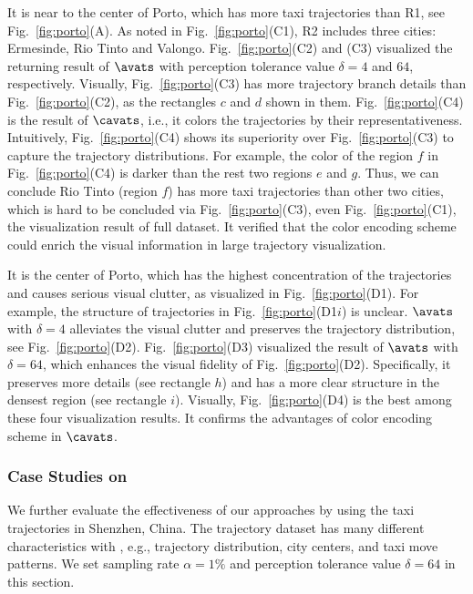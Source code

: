  It is near to the center of Porto, which has more taxi trajectories than R1, see Fig.~\ref{fig:porto}(A).
As noted in Fig.~\ref{fig:porto}(C1), R2 includes three cities: Ermesinde, Rio Tinto and Valongo.
Fig.~\ref{fig:porto}(C2) and (C3) visualized the returning result of $\avats$ with perception tolerance value $\delta=4$ and $64$, respectively.
Visually, Fig.~\ref{fig:porto}(C3) has more trajectory branch details than Fig.~\ref{fig:porto}(C2), as the rectangles $c$ and $d$ shown in them.
Fig.~\ref{fig:porto}(C4) is the result of $\cavats$, i.e., it colors the trajectories by their representativeness.
Intuitively, Fig.~\ref{fig:porto}(C4) shows its superiority over Fig.~\ref{fig:porto}(C3) to capture the trajectory distributions.
For example, the color of the region $f$ in Fig.~\ref{fig:porto}(C4) is {darker} than the rest two regions $e$ and $g$.
Thus, we can conclude Rio Tinto (region $f$) has more taxi trajectories than other two cities, which is hard to be concluded via Fig.~\ref{fig:porto}(C3), even Fig.~\ref{fig:porto}(C1), the visualization result of full dataset.
It verified that the color encoding scheme could enrich the visual information in large trajectory visualization.

 It is the center of Porto, which has the highest concentration of the trajectories and causes serious visual clutter, as visualized in Fig.~\ref{fig:porto}(D1).
For example, the structure of trajectories in Fig.~\ref{fig:porto}(D1$i$) is unclear.
$\avats$ with $\delta=4$ alleviates the visual clutter and preserves the trajectory distribution, see Fig.~\ref{fig:porto}(D2).
Fig.~\ref{fig:porto}(D3) visualized the result of $\avats$ with $\delta=64$, which enhances the visual fidelity of Fig.~\ref{fig:porto}(D2).
Specifically, it preserves more details (see rectangle $h$) and has a more clear structure in the {densest} region (see rectangle $i$).
Visually, Fig.~\ref{fig:porto}(D4) is the best among these four visualization results.
It confirms the advantages of color encoding scheme in $\cavats$.


\subsubsection{Case Studies on \sz}\label{sec:sz}
We further evaluate the effectiveness of our approaches by using the taxi trajectories in Shenzhen, China.
The \sz{} trajectory dataset has many different characteristics with \pt{}, e.g., trajectory distribution, city centers, and taxi move patterns.
We set sampling rate $\alpha=1\%$ and perception tolerance value $\delta = 64$ in this section.

